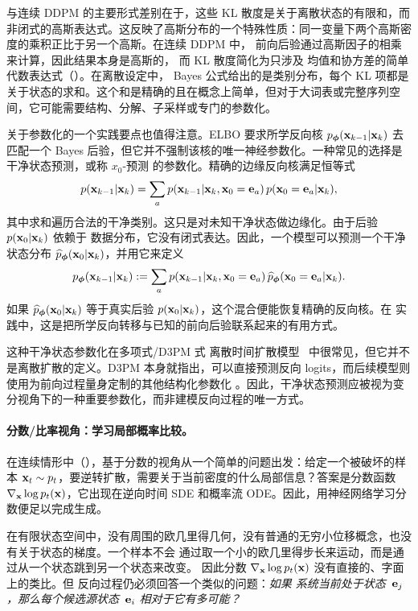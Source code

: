 与连续 DDPM 的主要形式差别在于，这些 KL 散度是关于离散状态的有限和，而非闭式的高斯表达式。这反映了高斯分布的一个特殊性质：同一变量下两个高斯密度的乘积正比于另一个高斯。在连续 DDPM 中，
前向后验通过高斯因子的相乘来计算，因此结果本身是高斯的，
而 KL 散度简化为只涉及
均值和协方差的简单代数表达式（）。在离散设定中，
Bayes 公式给出的是类别分布，每个 KL 项都是关于状态的求和。这个和是精确的且在概念上简单，但对于大词表或完整序列空间，它可能需要结构、分解、子采样或专门的参数化。

关于参数化的一个实践要点也值得注意。ELBO 要求所学反向核 $p_{{\bm{\phi}}}({\mathbf{x}}_{k-1}|{\mathbf{x}}_k)$ 去匹配一个 Bayes 后验，但它并不强制该核的唯一神经参数化。一种常见的选择是干净状态预测，或称 $x_0$-预测
的参数化。精确的边缘反向核满足恒等式
\[
p({\mathbf{x}}_{k-1}|{\mathbf{x}}_k)
=
\sum_{a}
p({\mathbf{x}}_{k-1}|{\mathbf{x}}_k,{\mathbf{x}}_0={\mathbf{e}}_a)\,
p({\mathbf{x}}_0={\mathbf{e}}_a|{\mathbf{x}}_k),
\]
其中求和遍历合法的干净类别。这只是对未知干净状态做边缘化。由于后验 $p({\mathbf{x}}_0|{\mathbf{x}}_k)$ 依赖于
数据分布，它没有闭式表达。因此，一个模型可以预测一个干净状态分布 $\widehat p_{{\bm{\phi}}}({\mathbf{x}}_0|{\mathbf{x}}_k)$，并用它来定义
\[
p_{{\bm{\phi}}}({\mathbf{x}}_{k-1}|{\mathbf{x}}_k)
:=
\sum_{a}
p({\mathbf{x}}_{k-1}|{\mathbf{x}}_k,{\mathbf{x}}_0={\mathbf{e}}_a)\,
\widehat p_{{\bm{\phi}}}({\mathbf{x}}_0={\mathbf{e}}_a|{\mathbf{x}}_k).
\]
如果 $\widehat p_{{\bm{\phi}}}({\mathbf{x}}_0|{\mathbf{x}}_k)$ 等于真实后验
$p({\mathbf{x}}_0|{\mathbf{x}}_k)$，这个混合便能恢复精确的反向核。在
实践中，这是把所学反向转移与已知的前向后验联系起来的有用方式。

这种干净状态参数化在多项式/D3PM 式
离散时间扩散模型~\citep{hoogeboom2021argmax,austin2021structured} 中很常见，但它并不是离散扩散的定义。D3PM 本身就指出，可以直接预测反向 logits，而后续模型则使用为前向过程量身定制的其他结构化参数化
\citep{sahoo2024simple}。因此，干净状态预测应被视为变分视角下的一种重要参数化，而非建模反向过程的唯一方式。

\paragraph{分数/比率视角：学习局部概率比较。}
在连续情形中（），基于分数的视角从一个简单的问题出发：给定一个被破坏的样本 ${\mathbf{x}}_t \sim p_t$，要逆转扩散，需要关于当前密度的什么局部信息？答案是分数函数
$\nabla_{{\mathbf{x}}}\log p_t({\mathbf{x}})$，它出现在逆向时间
SDE 和概率流 ODE\@。因此，用神经网络学习分数便足以完成生成。

在有限状态空间中，没有周围的欧几里得几何，没有普通的无穷小位移概念，也没有关于状态的梯度。一个样本不会
通过取一个小的欧几里得步长来运动，而是通过从一个状态跳到另一个状态来改变。
因此分数 $\nabla_{{\mathbf{x}}}\log p_t({\mathbf{x}})$ 没有直接的、字面上的类比。但
反向过程仍必须回答一个类似的问题：\emph{如果
系统当前处于状态~${\mathbf{e}}_j$，那么每个候选源状态~${\mathbf{e}}_i$ 相对于它有多可能？}

